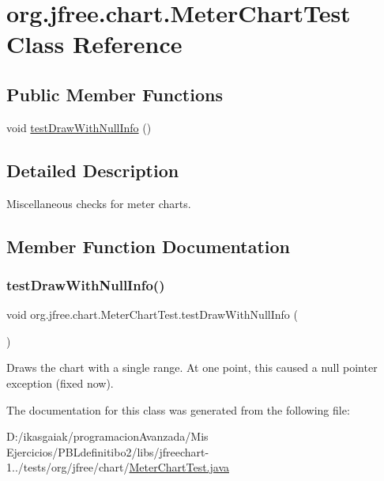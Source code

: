 \hypertarget{classorg_1_1jfree_1_1chart_1_1_meter_chart_test}{}\section{org.\+jfree.\+chart.\+Meter\+Chart\+Test Class Reference}
\label{classorg_1_1jfree_1_1chart_1_1_meter_chart_test}
\subsection*{Public Member Functions}
\begin{DoxyCompactItemize}
\item 
void \mbox{\hyperlink{classorg_1_1jfree_1_1chart_1_1_meter_chart_test_a14dbf079a9d6a73d2e0741dfed2fede8}{test\+Draw\+With\+Null\+Info}} ()
\end{DoxyCompactItemize}


\subsection{Detailed Description}
Miscellaneous checks for meter charts. 

\subsection{Member Function Documentation}
\mbox{\label{classorg_1_1jfree_1_1chart_1_1_meter_chart_test_a14dbf079a9d6a73d2e0741dfed2fede8}} 
\subsubsection{\texorpdfstring{test\+Draw\+With\+Null\+Info()}{testDrawWithNullInfo()}}
{\footnotesize\ttfamily void org.\+jfree.\+chart.\+Meter\+Chart\+Test.\+test\+Draw\+With\+Null\+Info (\begin{DoxyParamCaption}{ }\end{DoxyParamCaption})}

Draws the chart with a single range. At one point, this caused a null pointer exception (fixed now). 

The documentation for this class was generated from the following file\+:\begin{DoxyCompactItemize}
\item 
D\+:/ikasgaiak/programacion\+Avanzada/\+Mis Ejercicios/\+P\+B\+Ldefinitibo2/libs/jfreechart-\/1../tests/org/jfree/chart/\mbox{\hyperlink{_meter_chart_test_8java}{Meter\+Chart\+Test.\+java}}\end{DoxyCompactItemize}
